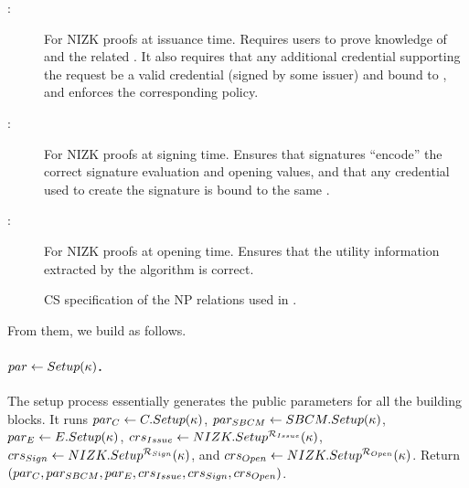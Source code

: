 \begin{description}
\item[\RelIss:] For NIZK proofs at issuance time. Requires users to
  prove knowledge of \usk and the related \upk. It also requires that any
  additional credential supporting the request be a valid credential (signed by
  some issuer) and bound to \upk, and enforces the corresponding \fissue policy.
\item[\RelSig:] For NIZK proofs at signing time. Ensures that
  signatures ``encode'' the correct signature evaluation and opening values, and
  that any credential used to create the signature is bound to the same \upk.
\item[\RelIns:] For NIZK proofs at opening time. Ensures that the
  utility information extracted by the \Open algorithm is correct.
\end{description}

\begin{figure}[ht!]
  \centering
  \scalebox{0.9}{
    
  }
  \caption{CS specification of the NP relations used in \CUASGen.}
  \label{fig:nizkrels}
\end{figure}

From them, we build \CUASGen as follows.

\paragraph{$par \gets Setup(\kappa)$.} %
The setup process essentially generates the public parameters for all the
building blocks. It runs $par_C \gets C.Setup(\kappa)$, $par_{SBCM} \gets
SBCM.Setup(\kappa)$, $par_{E} \gets E.Setup(\kappa)$, $crs_{Issue} \gets
NIZK.Setup^{\mathcal{R}_{Issue}}(\kappa)$, $crs_{Sign} \gets
NIZK.Setup^{\mathcal{R}_{Sign}}(\kappa)$, and $crs_{Open} \gets
NIZK.Setup^{\mathcal{R}_{Open}}(\kappa)$. Return $(par_C,par_{SBCM},par_{E},
crs_{Issue},crs_{Sign},crs_{Open})$.


